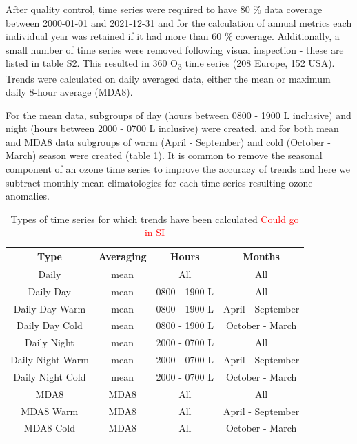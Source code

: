 \documentclass[journal abbreviation, manuscript]{copernicus}
\begin{document}
After quality control, time series were required to have 80 \% data coverage between 2000-01-01 and 2021-12-31 and for the calculation of annual metrics each individual year was retained if it had more than 60 \% coverage. Additionally, a small number of time series were removed following visual inspection - these are listed in table S2. This resulted in 360 O\textsubscript{3} time series (208 Europe, 152 USA). Trends were calculated on daily averaged data, either the mean or maximum daily 8-hour average (MDA8). 

For the mean data, subgroups of day (hours between 0800 - 1900 L inclusive) and night (hours between 2000 - 0700 L inclusive) were created, and for both mean and MDA8 data subgroups of warm (April - September) and cold (October - March) season were created (table \ref{tab:ts_types}). It is common to remove the seasonal component of an ozone time series to improve the accuracy of trends \citep{cooper_2020} and here we subtract monthly mean climatologies for each time series resulting ozone anomalies. 

\begin{table}[h]
\caption{Types of time series for which trends have been calculated \textcolor{red}{Could go in SI}}
\begin{tabular}{c|c c c}
Type              & Averaging & Hours         & Months            \\ \hline
Daily             & mean      & All           & All               \\
Daily Day         & mean      & 0800 - 1900 L & All               \\
Daily Day Warm    & mean      & 0800 - 1900 L & April - September \\
Daily Day Cold    & mean      & 0800 - 1900 L & October - March   \\
Daily Night       & mean      & 2000 - 0700 L & All               \\
Daily Night Warm  & mean      & 2000 - 0700 L & April - September \\
Daily Night Cold  & mean      & 2000 - 0700 L & October - March   \\
MDA8              & MDA8      & All           & All               \\
MDA8 Warm         & MDA8      & All           & April - September \\
MDA8 Cold         & MDA8      & All           & October - March   \\
\end{tabular}
\label{tab:ts_types}
\end{table}
\end{document}
